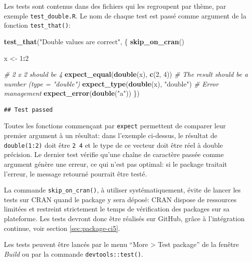 \documentclass[
  12pt,
  french,
  a4paper,
  extrafontsizes,onecolumn,openright
  ]{memoir}
\newenvironment{Shaded}{\begin{snugshade}}{\end{snugshade}}
\newcommand{\CommentTok}[1]{\textcolor[rgb]{0.56,0.35,0.01}{\textit{#1}}}
\newcommand{\DecValTok}[1]{\textcolor[rgb]{0.00,0.00,0.81}{#1}}
\newcommand{\FunctionTok}[1]{\textcolor[rgb]{0.13,0.29,0.53}{\textbf{#1}}}
\newcommand{\NormalTok}[1]{#1}
\newcommand{\OtherTok}[1]{\textcolor[rgb]{0.56,0.35,0.01}{#1}}
\newcommand{\SpecialCharTok}[1]{\textcolor[rgb]{0.81,0.36,0.00}{\textbf{#1}}}
\newcommand{\StringTok}[1]{\textcolor[rgb]{0.31,0.60,0.02}{#1}}
\begin{document}
\normalsize

Les tests sont contenus dans des fichiers qui les regroupent par thème, par exemple \texttt{test\_double.R}.
Le nom de chaque test est passé comme argument de la fonction \texttt{test\_that()}:

\scriptsize

\begin{Shaded}
\begin{Highlighting}[]
\FunctionTok{test\_that}\NormalTok{(}\StringTok{"Double values are correct"}\NormalTok{, \{}
  \FunctionTok{skip\_on\_cran}\NormalTok{()}

\NormalTok{  x }\OtherTok{\textless{}{-}} \DecValTok{1}\SpecialCharTok{:}\DecValTok{2}

  \CommentTok{\# 2 x 2 should be 4}
  \FunctionTok{expect\_equal}\NormalTok{(}\FunctionTok{double}\NormalTok{(x), }\FunctionTok{c}\NormalTok{(}\DecValTok{2}\NormalTok{, }\DecValTok{4}\NormalTok{))}
  \CommentTok{\# The result should be a number (type = "double")}
  \FunctionTok{expect\_type}\NormalTok{(}\FunctionTok{double}\NormalTok{(x), }\StringTok{"double"}\NormalTok{)}
  \CommentTok{\# Error management}
  \FunctionTok{expect\_error}\NormalTok{(}\FunctionTok{double}\NormalTok{(}\StringTok{"a"}\NormalTok{))}
\NormalTok{\})}
\end{Highlighting}
\end{Shaded}

\begin{verbatim}
## Test passed
\end{verbatim}

\normalsize

Toutes les fonctions commençant par \texttt{expect} permettent de comparer leur premier argument à un résultat: dans l'exemple ci-dessus, le résultat de \texttt{double(1:2)} doit être \texttt{2\ 4} et le type de ce vecteur doit être réel à double précision.
Le dernier test vérifie qu'une chaîne de caractère passée comme argument génère une erreur, ce qui n'est pas optimal: si le package traitait l'erreur, le message retourné pourrait être testé.

La commande \texttt{skip\_on\_cran()}, à utiliser systématiquement, évite de lancer les tests sur CRAN quand le package y sera déposé: CRAN dispose de ressources limitées et restreint strictement le temps de vérification des packages sur sa plateforme.
Les tests devront donc être réalisés sur GitHub, grâce à l'intégration continue, voir section \ref{sec:package-ci5}.

Les tests peuvent être lancés par le menu \enquote{More \textgreater{} Test package} de la fenêtre \emph{Build} ou par la commande \texttt{devtools::test()}.
\end{document}
